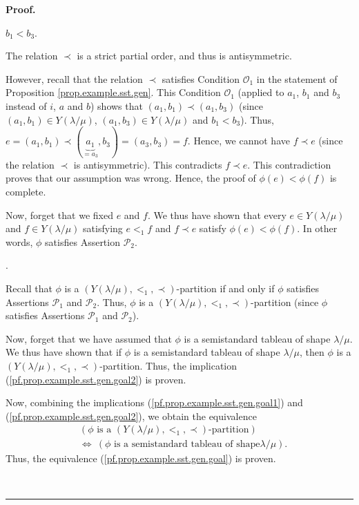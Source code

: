 \documentclass[numbers=enddot,12pt,final,onecolumn,notitlepage,abstracton]{scrartcl}
\theoremstyle{definition}
\newenvironment{proof}[1][Proof]{\noindent\textbf{#1.} }{\ \rule{0.5em}{0.5em}}
\newenvironment{verlong}{}{}
\begin{document}
\begin{verlong}
\begin{footnotesize}
\begin{proof}
{$b_{1}<b_{3}$.
\par
The relation $\prec$ is a strict partial order, and thus is antisymmetric.
\par
However, recall that the relation $\prec$ satisfies Condition $\mathcal{O}%
_{1}$ in the statement of Proposition \ref{prop.example.sst.gen}. This
Condition $\mathcal{O}_{1}$ (applied to $a_{1}$, $b_{1}$ and $b_{3}$ instead
of $i$, $a$ and $b$) shows that $\left(  a_{1},b_{1}\right)  \prec\left(
a_{1},b_{3}\right)  $ (since $\left(  a_{1},b_{1}\right)  \in Y\left(
\lambda/\mu\right)  $, $\left(  a_{1},b_{3}\right)  \in Y\left(  \lambda
/\mu\right)  $ and $b_{1}<b_{3}$). Thus, $e=\left(  a_{1},b_{1}\right)
\prec\left(  \underbrace{a_{1}}_{=a_{3}},b_{3}\right)  =\left(  a_{3}%
,b_{3}\right)  =f$. Hence, we cannot have $f\prec e$ (since the relation
$\prec$ is antisymmetric). This contradicts $f\prec e$. This contradiction
proves that our assumption was wrong. Hence, the proof of $\phi\left(
e\right)  <\phi\left(  f\right)  $ is complete.
\par
Now, forget that we fixed $e$ and $f$. We thus have shown that every $e\in
Y\left(  \lambda/\mu\right)  $ and $f\in Y\left(  \lambda/\mu\right)  $
satisfying $e<_{1}f$ and $f\prec e$ satisfy $\phi\left(  e\right)
<\phi\left(  f\right)  $. In other words, $\phi$ satisfies Assertion
$\mathcal{P}_{2}$.}.

Recall that $\phi$ is a $\left(  Y\left(  \lambda/\mu\right)  ,<_{1}%
,\prec\right)  $-partition if and only if $\phi$ satisfies Assertions
$\mathcal{P}_{1}$ and $\mathcal{P}_{2}$. Thus, $\phi$ is a $\left(  Y\left(
\lambda/\mu\right)  ,<_{1},\prec\right)  $-partition (since $\phi$ satisfies
Assertions $\mathcal{P}_{1}$ and $\mathcal{P}_{2}$).

Now, forget that we have assumed that $\phi$ is a semistandard tableau of
shape $\lambda/\mu$. We thus have shown that if $\phi$ is a semistandard
tableau of shape $\lambda/\mu$, then $\phi$ is a $\left(  Y\left(  \lambda
/\mu\right)  ,<_{1},\prec\right)  $-partition. Thus, the implication
(\ref{pf.prop.example.sst.gen.goal2}) is proven.

Now, combining the implications (\ref{pf.prop.example.sst.gen.goal1}) and
(\ref{pf.prop.example.sst.gen.goal2}), we obtain the equivalence%
\begin{align*}
&  \left(  \phi\text{ is a }\left(  Y\left(  \lambda/\mu\right)  ,<_{1}%
,\prec\right)  \text{-partition}\right) \\
&  \Longleftrightarrow\ \left(  \phi\text{ is a semistandard tableau of shape
}\lambda/\mu\right)  .
\end{align*}
Thus, the equivalence (\ref{pf.prop.example.sst.gen.goal}) is proven.


\end{proof}
\end{footnotesize}
\end{verlong}
\end{document}
